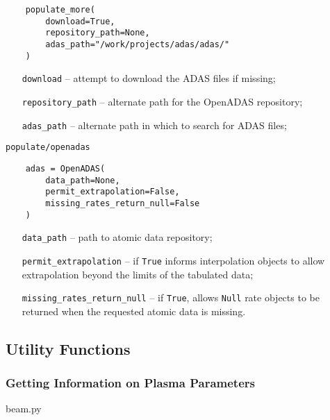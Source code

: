 \documentclass[../main.tex]{subfiles}
\begin{document}
\begin{verbatim}
    populate_more(
        download=True,
        repository_path=None,
        adas_path="/work/projects/adas/adas/"
    )
\end{verbatim}

\begin{itemize}[align=left]
    \item[\texttt{download}] -- attempt to download the ADAS files if missing;
    \item[\texttt{repository\_path}] -- alternate path for the OpenADAS repository;
    \item[\texttt{adas\_path}] -- alternate path in which to search for ADAS files;
\end{itemize}

\texttt{populate/openadas}

\begin{verbatim}
    adas = OpenADAS(
        data_path=None,
        permit_extrapolation=False,
        missing_rates_return_null=False
    )
\end{verbatim}

\begin{itemize}[align=left]
    \item[\texttt{data\_path}] -- path to atomic data repository;
    \item[\texttt{permit\_extrapolation}] -- if \texttt{True} informs interpolation objects to allow extrapolation beyond the limits of the tabulated data;
    \item[\texttt{missing\_rates\_return\_null}] -- if \texttt{True}, allows \texttt{Null} rate objects to be returned when the requested atomic data is missing.
\end{itemize}

\subsection{Utility Functions}%
\label{sec:utility}

\subsubsection{Getting Information on Plasma Parameters}%
\label{sec:info}


beam.py
\end{document}
